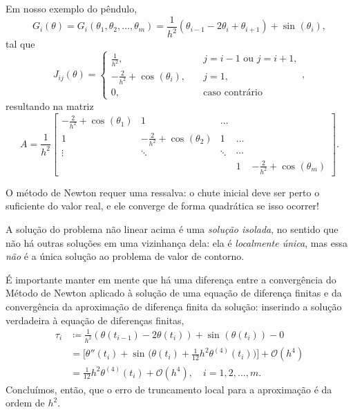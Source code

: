 \documentclass[../differential_methods.tex]{subfiles}
\begin{document}
Em nosso exemplo do pêndulo,
\[
	G_{i}(\theta )=G_{i}(\theta_1, \theta_2, \dotsc, \theta_{m})=\frac{1}{h^{2}}(\theta_{i-1}-2\theta_{i}+\theta_{i+1})+\sin^{}{(\theta_{i})},
\]
tal que
\[
	J_{ij}(\theta )  = \left\{\begin{array}{ll}
		\frac{1}{h^{2}},                        & \quad j=i-1 \text{ ou } j=i+1, \\
		-\frac{2}{h^{2}}+\cos^{}{(\theta_{i})}, & \quad j=1,                     \\
		0,                                      & \quad \text{caso contrário}
	\end{array}\right.,
\]
resultando na matriz
\[
	A=\frac{1}{h^{2}} \begin{bmatrix}
		-\frac{2}{h^{2}}+\cos^{}{(\theta_1)} & 1                                      & \dotsc &        &                                        \\
		1                                    & -\frac{2}{h^{2}}+\cos^{}{(\theta_{2})} & 1      & \dotsc &                                        \\
		\vdots                               & \ddots                                 & \ddots & \cdots &                                        \\
		                                     &                                        &        & 1      & -\frac{2}{h^{2}}+\cos^{}{(\theta_{m})}
	\end{bmatrix}.
\]

\begin{tcolorbox}[
		skin=enhanced,
		title=Observação,
		fonttitle=\bfseries,
		colframe=black,
		colbacktitle=cyan!75!white,
		colback=cyan!15,
		colbacklower=black,
		coltitle=black,
		drop fuzzy shadow,
	]
	O método de Newton requer uma ressalva: o chute inicial deve ser perto o suficiente do valor real, e ele converge de forma quadrática se isso ocorrer!
\end{tcolorbox}
A solução do problema não linear acima é uma \textit{solução isolada}, no sentido que não há outras soluções em uma vizinhança dela: ela é \textit{localmente única}, mas essa \textit{não} é a única solução ao problema de valor de contorno.

É importante manter em mente que há uma diferença entre a convergência do Método de Newton aplicado à solução de uma equação de diferença finitas e da convergência da aproximação de diferença finita da solução: inserindo a solução verdadeira à equação de diferenças finitas,
\begin{align*}
	\tau_{i} & \coloneqq \frac{1}{h^{2}}(\theta(t_{i-1})-2\theta(t_{i}))+\sin^{}{(\theta(t_{i}))}-0                                           \\
	         & = \biggl[\theta''(t_{i})+\sin^{}{\biggl(\theta(t_{i})+\frac{1}{12}h^{2}\theta^{(4)}(t_{i})\biggr)}\biggr] + \mathcal{O}(h^{4}) \\
	         & = \frac{1}{12}h^{2}\theta^{(4)}(t_{i})+\mathcal{O}(h^{4}),\quad i=1,2,\dotsc ,m.
\end{align*}
Concluímos, então, que o erro de truncamento local para a aproximação é da ordem de \(h^{2}\).
\end{document}
